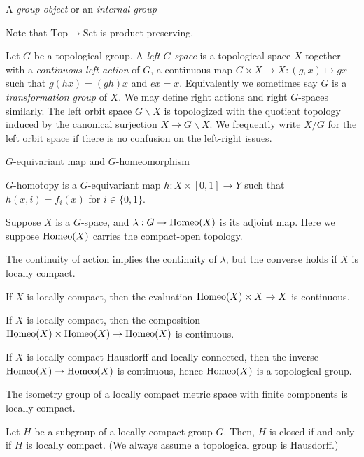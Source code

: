\documentclass{../../large}
\begin{document}
A \emph{group object} or an \emph{internal group} 

Note that $\mathrm{Top}\to\mathrm{Set}$ is product preserving.



\begin{prb}
Let $G$ be a topological group.
A \emph{left $G$-space} is a topological space $X$ together with a \emph{continuous left action} of $G$, a continuous map $G\times X\to X:(g,x)\mapsto gx$ such that $g(hx)=(gh)x$ and $ex=x$.
Equivalently we sometimes say $G$ is a \emph{transformation group} of $X$.
We may define right actions and right $G$-spaces similarly.
The left orbit space $G\backslash X$ is topologized with the quotient topology induced by the canonical surjection $X\to G\backslash X$.
We frequently write $X/G$ for the left orbit space if there is no confusion on the left-right issues.

$G$-equivariant map and $G$-homeomorphism

$G$-homotopy is a $G$-equivariant map $h:X\times[0,1]\to Y$ such that $h(x,i)=f_i(x)$ for $i\in\{0,1\}$.
\end{prb}

\begin{prb}
Suppose $X$ is a $G$-space, and $\lambda:G\to\operatorname{Homeo}(X)$ is its adjoint map.
Here we suppose $\operatorname{Homeo}(X)$ carries the compact-open topology.
\begin{parts}
\item The continuity of action implies the continuity of $\lambda$, but the converse holds if $X$ is locally compact.
\item If $X$ is locally compact, then the evaluation $\operatorname{Homeo}(X)\times X\to X$ is continuous.
\item If $X$ is locally compact, then the composition $\operatorname{Homeo}(X)\times\operatorname{Homeo}(X)\to\operatorname{Homeo}(X)$ is continuous.
\item If $X$ is locally compact Hausdorff and locally connected, then the inverse $\operatorname{Homeo}(X)\to\operatorname{Homeo}(X)$ is continuous, hence $\operatorname{Homeo}(X)$ is a topological group.
\end{parts}
\end{prb}


The isometry group of a locally compact metric space with finite components is locally compact.


\begin{prb}
Let $H$ be a subgroup of a locally compact group $G$.
Then, $H$ is closed if and only if $H$ is locally compact.
(We always assume a topological group is Hausdorff.)
\end{prb}
\end{document}
